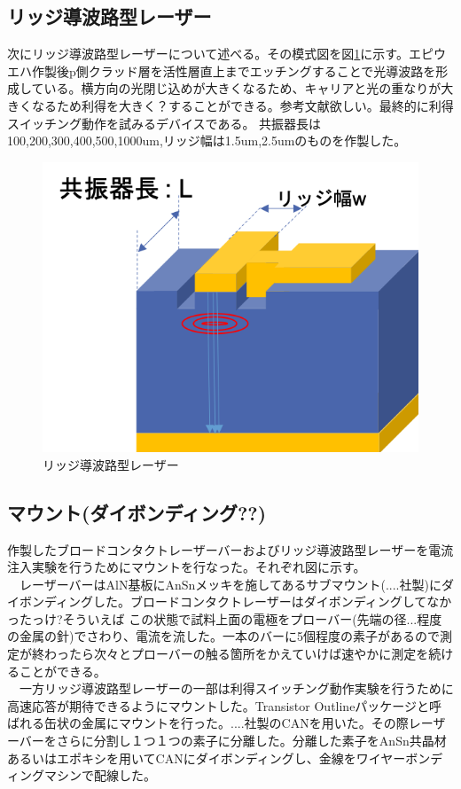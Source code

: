 \subsection{リッジ導波路型レーザー}%
次にリッジ導波路型レーザーについて述べる。その模式図を図\ref{fig_2_1_ridge}に示す。エピウエハ作製後p側クラッド層を活性層直上までエッチングすることで光導波路を形成している。横方向の光閉じ込めが大きくなるため、キャリアと光の重なりが大きくなるため利得を大きく？することができる。参考文献欲しい。最終的に利得スイッチング動作を試みるデバイスである。
共振器長は100,200,300,400,500,1000um,リッジ幅は1.5um,2.5umのものを作製した。
\begin{figure}[htbp]
	\includegraphics[width=15cm]{figure/fig_2_1_ridge.png}
	\caption{リッジ導波路型レーザー}
	\label{fig_2_1_ridge}
\end{figure}

\subsection{マウント(ダイボンディング??)}%
作製したブロードコンタクトレーザーバーおよびリッジ導波路型レーザーを電流注入実験を行うためにマウントを行なった。それぞれ図に示す。\\
　レーザーバーはAlN基板にAnSnメッキを施してあるサブマウント(....社製)にダイボンディングした。ブロードコンタクトレーザーはダイボンディングしてなかったっけ?そういえば
この状態で試料上面の電極をプローバー(先端の径...程度の金属の針)でさわり、電流を流した。一本のバーに5個程度の素子があるので測定が終わったら次々とプローバーの触る箇所をかえていけば速やかに測定を続けることができる。\\
　一方リッジ導波路型レーザーの一部は利得スイッチング動作実験を行うために高速応答が期待できるようにマウントした。Transistor Outlineパッケージと呼ばれる缶状の金属にマウントを行った。....社製のCANを用いた。その際レーザーバーをさらに分割し１つ１つの素子に分離した。分離した素子をAnSn共晶材あるいはエポキシを用いてCANにダイボンディングし、金線をワイヤーボンディングマシンで配線した。



